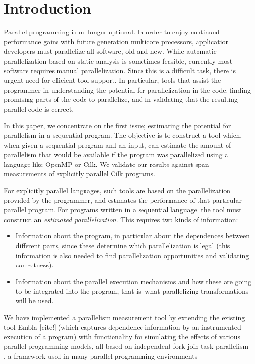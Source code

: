 \section{Introduction}

Parallel programming is no longer optional.  In order to enjoy continued
performance gains with future generation multicore processors,
application developers must parallelize all software, old and
new.
While automatic parallelization based on static analysis 
is sometimes feasible, currently most software requires manual
parallelization.
Since this is a difficult task, there is urgent need for efficient tool support. 
In particular, tools that assist the programmer in understanding the potential 
for parallelization in the code, finding promising parts of the code to parallelize, 
and in validating that the resulting parallel code is correct.

In this paper, we concentrate on the first issue; estimating the potential 
for parallelism in a sequential program. The objective is to construct a tool
which, when given a sequential program and an input, can estimate the 
amount of parallelism that would be available if the program was parallelized
using a language like OpenMP or Cilk. We validate our results against span 
measurements of explicitly parallel Cilk programs.

For explicitly parallel languages, 
such tools are based on the parallelization provided by the programmer, and 
estimates the performance of that particular parallel program. For programs written
in a sequential language, the tool must construct
an {\em estimated parallelization}. This requires two kinds of information:
\begin{itemize}
\item
Information about the program, in particular about the dependences between 
different parts, since these determine which parallelization is legal (this 
information is also needed to find parallelization opportunities and validating 
correctness).
\item
Information about the parallel execution mechanisms and how these are going
to be integrated into the program, that is, what parallelizing transformations 
will be used.
\end{itemize}
We have implemented a parallelism measurement tool by extending the existing
tool Embla [cite!] (which captures dependence information by an instrumented 
execution of a program) with functionality for simulating the effects of various parallel 
programming models, all based on independent fork-join task parallelism
, a framework used in many parallel programming environments.

